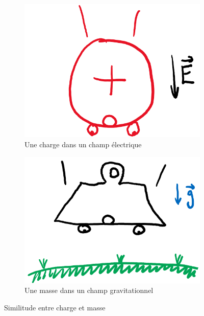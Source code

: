 \documentclass{article}
\begin{document}
\begin{figure}[h]
    \centering
    \begin{subfigure}[c]{0.4\textwidth}
        \centering
        \includegraphics[height=0.7\textwidth]{Images/Charge accélérée.png}
        \caption{Une charge dans un champ électrique}
    \end{subfigure}
    \hspace{0.05\textwidth}
    \begin{subfigure}[c]{0.4\textwidth}
        \centering
        \includegraphics[height=0.7\textwidth]{Images/Masse accélérée.png}
        \caption{Une masse dans un champ gravitationnel}
    \end{subfigure}
    \caption{Similitude entre charge et masse}
\end{figure}
\end{document}
